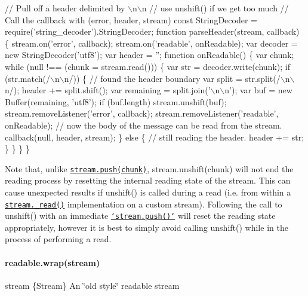 \begin{DoxyCode}
// Pull off a header delimited by \(\backslash\)n\(\backslash\)n
// use unshift() if we get too much
// Call the callback with (error, header, stream)
const StringDecoder = require('string\_decoder').StringDecoder;
function parseHeader(stream, callback) \{
  stream.on('error', callback);
  stream.on('readable', onReadable);
  var decoder = new StringDecoder('utf8');
  var header = '';
  function onReadable() \{
    var chunk;
    while (null !== (chunk = stream.read())) \{
      var str = decoder.write(chunk);
      if (str.match(/\(\backslash\)n\(\backslash\)n/)) \{
        // found the header boundary
        var split = str.split(/\(\backslash\)n\(\backslash\)n/);
        header += split.shift();
        var remaining = split.join('\(\backslash\)n\(\backslash\)n');
        var buf = new Buffer(remaining, 'utf8');
        if (buf.length)
          stream.unshift(buf);
        stream.removeListener('error', callback);
        stream.removeListener('readable', onReadable);
        // now the body of the message can be read from the stream.
        callback(null, header, stream);
      \} else \{
        // still reading the header.
        header += str;
      \}
    \}
  \}
\}
\end{DoxyCode}


Note that, unlike \href{#stream_readable_push_chunk_encoding}{\tt {\ttfamily stream.\+push(chunk)}}, {\ttfamily stream.\+unshift(chunk)} will not end the reading process by resetting the internal reading state of the stream. This can cause unexpected results if {\ttfamily unshift()} is called during a read (i.\+e. from within a \href{#stream_readable_read_size_1}{\tt {\ttfamily stream.\+\_\+read()}} implementation on a custom stream). Following the call to {\ttfamily unshift()} with an immediate \href{#stream_readable_push_chunk_encoding}{\tt `stream.push(\textquotesingle{}\textquotesingle{})`} will reset the reading state appropriately, however it is best to simply avoid calling {\ttfamily unshift()} while in the process of performing a read.

\paragraph*{readable.\+wrap(stream)}


\begin{DoxyItemize}
\item {\ttfamily stream} \{Stream\} An \char`\"{}old style\char`\"{} readable stream
\end{DoxyItemize}

